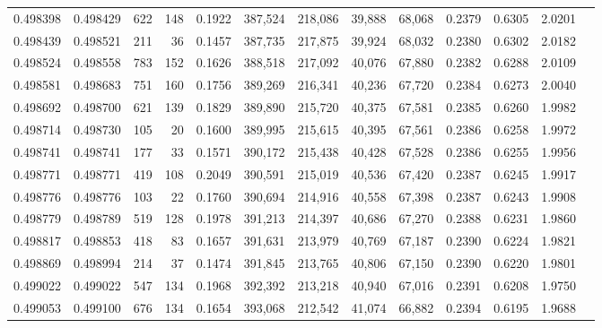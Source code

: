 \begin{tabular}{rrrrrrrrrrrrr}
0.498398 & 0.498429 &   622 &   148 &                                     0.1922 & 387,524 & 218,086 &  39,888 &  68,068 & 0.2379 & 0.6305 & 2.0201 \\
0.498439 & 0.498521 &   211 &    36 &                                     0.1457 & 387,735 & 217,875 &  39,924 &  68,032 & 0.2380 & 0.6302 & 2.0182 \\
0.498524 & 0.498558 &   783 &   152 &                                     0.1626 & 388,518 & 217,092 &  40,076 &  67,880 & 0.2382 & 0.6288 & 2.0109 \\
0.498581 & 0.498683 &   751 &   160 &                                     0.1756 & 389,269 & 216,341 &  40,236 &  67,720 & 0.2384 & 0.6273 & 2.0040 \\
0.498692 & 0.498700 &   621 &   139 &                                     0.1829 & 389,890 & 215,720 &  40,375 &  67,581 & 0.2385 & 0.6260 & 1.9982 \\
0.498714 & 0.498730 &   105 &    20 &                                     0.1600 & 389,995 & 215,615 &  40,395 &  67,561 & 0.2386 & 0.6258 & 1.9972 \\
0.498741 & 0.498741 &   177 &    33 &                                     0.1571 & 390,172 & 215,438 &  40,428 &  67,528 & 0.2386 & 0.6255 & 1.9956 \\
0.498771 & 0.498771 &   419 &   108 &                                     0.2049 & 390,591 & 215,019 &  40,536 &  67,420 & 0.2387 & 0.6245 & 1.9917 \\
0.498776 & 0.498776 &   103 &    22 &                                     0.1760 & 390,694 & 214,916 &  40,558 &  67,398 & 0.2387 & 0.6243 & 1.9908 \\
0.498779 & 0.498789 &   519 &   128 &                                     0.1978 & 391,213 & 214,397 &  40,686 &  67,270 & 0.2388 & 0.6231 & 1.9860 \\
0.498817 & 0.498853 &   418 &    83 &                                     0.1657 & 391,631 & 213,979 &  40,769 &  67,187 & 0.2390 & 0.6224 & 1.9821 \\
0.498869 & 0.498994 &   214 &    37 &                                     0.1474 & 391,845 & 213,765 &  40,806 &  67,150 & 0.2390 & 0.6220 & 1.9801 \\
0.499022 & 0.499022 &   547 &   134 &                                     0.1968 & 392,392 & 213,218 &  40,940 &  67,016 & 0.2391 & 0.6208 & 1.9750 \\
0.499053 & 0.499100 &   676 &   134 &                                     0.1654 & 393,068 & 212,542 &  41,074 &  66,882 & 0.2394 & 0.6195 & 1.9688 \\

\end{tabular}
